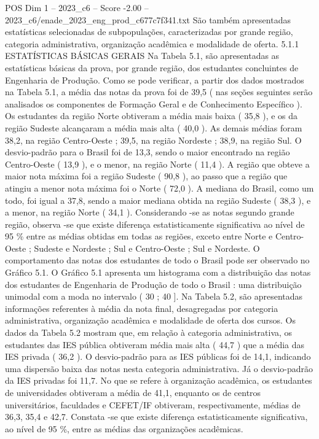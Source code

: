\begin{textsample}{POS Dim 1 – 2023\_c6 – Score -2.00 – 2023\_c6/enade\_2023\_eng\_prod\_c677c7f341.txt}
São também apresentadas estatísticas selecionadas de subpopulações, caracterizadas por grande região, categoria administrativa, organização acadêmica e modalidade de oferta. 5.1.1 ESTATÍSTICAS BÁSICAS GERAIS Na Tabela 5.1, são apresentadas as estatísticas básicas da prova, por grande região, dos estudantes concluintes de Engenharia de Produção.
Como se pode verificar, a partir dos dados mostrados na Tabela 5.1, a média das notas da prova foi de 39,5 ( nas seções seguintes serão analisados os componentes de Formação Geral e de Conhecimento Específico ).
Os estudantes da região Norte obtiveram a média mais baixa ( 35,8 ), e os da região Sudeste alcançaram a média mais alta ( 40,0 ).
As demais médias foram 38,2, na região Centro-Oeste ; 39,5, na região Nordeste ; 38,9, na região Sul.
O desvio-padrão para o Brasil foi de 13,3, sendo o maior encontrado na região Centro-Oeste ( 13,9 ), e o menor, na região Norte ( 11,4 ).
A região que obteve a maior nota máxima foi a região Sudeste ( 90,8 ), ao passo que a região que atingiu a menor nota máxima foi o Norte ( 72,0 ).
A mediana do Brasil, como um todo, foi igual a 37,8, sendo a maior mediana obtida na região Sudeste ( 38,3 ), e a menor, na região Norte ( 34,1 ).
Considerando -se as notas segundo grande região, observa -se que existe diferença estatisticamente significativa ao nível de 95 \% entre as médias obtidas em todas as regiões, exceto entre Norte e Centro-Oeste ; Sudeste e Nordeste ; Sul e Centro-Oeste ; Sul e Nordeste.
O comportamento das notas dos estudantes de todo o Brasil pode ser observado no Gráfico 5.1.
O Gráfico 5.1 apresenta um histograma com a distribuição das notas dos estudantes de Engenharia de Produção de todo o Brasil : uma distribuição unimodal com a moda no intervalo ( 30 ; 40 ].
Na Tabela 5.2, são apresentadas informações referentes à média da nota final, desagregadas por categoria administrativa, organização acadêmica e modalidade de oferta dos cursos.
Os dados da Tabela 5.2 mostram que, em relação à categoria administrativa, os estudantes das IES pública obtiveram média mais alta ( 44,7 ) que a média das IES privada ( 36,2 ).
O desvio-padrão para as IES públicas foi de 14,1, indicando uma dispersão baixa das notas nesta categoria administrativa.
Já o desvio-padrão da IES privadas foi 11,7.
No que se refere à organização acadêmica, os estudantes de universidades obtiveram a média de 41,1, enquanto os de centros universitários, faculdades e CEFET/IF obtiveram, respectivamente, médias de 36,3, 35,4 e 42,7.
Constata -se que existe diferença estatisticamente significativa, ao nível de 95 \%, entre as médias das organizações acadêmicas.

\end{textsample}
